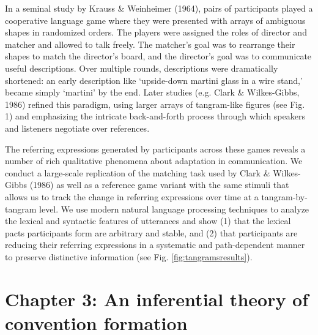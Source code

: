 \documentclass[12pt, donotrepeattitle, man, floatsintext]{apa6}
\begin{document}
In a seminal study by Krauss \& Weinheimer (1964), pairs of participants played a cooperative language game where they were presented with arrays of ambiguous shapes in randomized orders. The players were assigned the roles of director and matcher and allowed to talk freely. The matcher's goal was to rearrange their shapes to match the director's board, and the director's goal was to communicate useful descriptions. Over multiple rounds, descriptions were dramatically shortened: an early description like `upside-down martini glass in a wire stand,' became simply `martini' by the end. Later studies (e.g. Clark \& Wilkes-Gibbs, 1986) refined this paradigm, using larger arrays of tangram-like figures (see Fig. 1) and emphasizing the intricate back-and-forth process through which speakers and listeners negotiate over references.

The referring expressions generated by participants across these games reveals a number of rich qualitative phenomena about adaptation in communication. We conduct a large-scale replication of the matching task used by Clark \& Wilkes-Gibbs (1986) as well as a reference game variant with the same stimuli that allows us to track the change in referring expressions over time at a tangram-by-tangram level. We use modern natural language processing techniques to analyze the lexical and syntactic features of utterances and show (1) that the lexical pacts participants form are arbitrary and stable, and (2) that participants are reducing their referring expressions in a systematic and path-dependent manner to preserve distinctive information (see Fig. \ref{fig:tangramsresults}).

\noindent{}
\section{Chapter 3: An inferential theory of convention formation}
\end{document}
